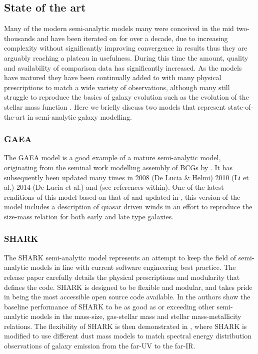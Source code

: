 \subsection{State of the art}
Many of the modern semi-analytic models many were conceived in the mid two-thousands and have been iterated on for over a decade, due to increasing complexity without significantly improving convergence in results thus they are arguably reaching a plateau in usefulness. During this time the amount, quality and availability of comparison data has significantly increased. As the models have matured they have been continually added to with many physical prescriptions to match a wide variety of observations, although many still struggle to reproduce the basics of galaxy evolution such as the evolution of the stellar mass function \cite{Asquith2018CosmicModels}. Here we briefly discuss two models that represent state-of-the-art in semi-analytic galaxy modelling.

\subsubsection{GAEA}
The GAEA model is a good example of a mature semi-analytic model, originating from the seminal work modelling assembly of BCGs by \citet{DeLucia2007TheGalaxies}. It has subsequently been updated many times in 2008 (De Lucia \& Helmi) 2010 (Li et al.) 2014 (De Lucia et al.) and \citet{Hirschmann2016GalaxyModel} (see references within).
One of the latest renditions of this model based on that of \citep{Xie2017H2-basedFormation} and updated in \citep{Zoldan2019TheEvolution}, this version of the model includes a description of quasar driven winds in an effort to reproduce the size-mass relation for both early and late type galaxies.

\subsubsection{SHARK}
The SHARK semi-analytic model represents an attempt to keep the field of semi-analytic models in line with current software engineering best practice. The release paper \citep{Lagos2018Shark:Formation} carefully details the physical prescriptions and modularity that defines the code. SHARK is designed to be flexible and modular, and takes pride in being the most accessible open source code available. In \citet{Lagos2018Shark:Formation} the authors show the baseline performance of SHARK to be as good as or exceeding other semi-analytic models in the mass-size, gas-stellar mass and stellar mass-metallicity relations. The flexibility of SHARK is then demonstrated in \citet{Lagos2019FromModel}, where  SHARK is modified to use different dust mass models to match spectral energy distribution observations of galaxy emission from the far-UV to the far-IR.

